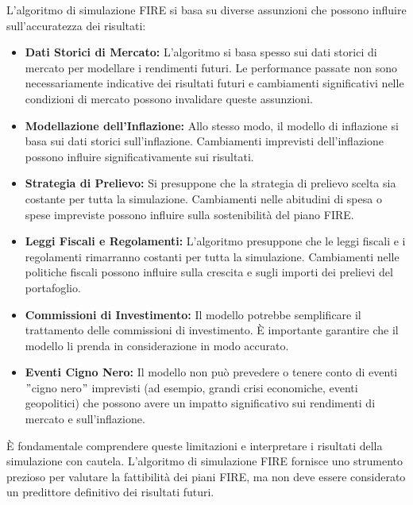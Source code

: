 \documentclass{article}
\begin{document}
L'algoritmo di simulazione FIRE si basa su diverse assunzioni che possono
influire sull'accuratezza dei risultati:
    \begin{itemize}
        \item \textbf{Dati Storici di Mercato:} L'algoritmo si basa spesso sui
        dati storici di mercato per modellare i rendimenti futuri.
        Le
        performance passate non sono necessariamente indicative dei risultati
        futuri e cambiamenti significativi nelle condizioni di mercato possono
        invalidare queste assunzioni.
        \item \textbf{Modellazione dell'Inflazione:} Allo stesso modo, il
        modello di inflazione si basa sui dati storici sull'inflazione.
        Cambiamenti imprevisti dell'inflazione possono influire
        significativamente sui risultati.
        \item \textbf{Strategia di Prelievo:} Si presuppone che la strategia di
        prelievo scelta sia costante per tutta la simulazione.
        Cambiamenti nelle
        abitudini di spesa o spese impreviste possono influire sulla
        sostenibilità del piano FIRE\@.
        \item \textbf{Leggi Fiscali e Regolamenti:} L'algoritmo presuppone che
        le leggi fiscali e i regolamenti rimarranno costanti per tutta la
        simulazione.
        Cambiamenti nelle politiche fiscali possono influire sulla
        crescita e sugli importi dei prelievi del portafoglio.
        \item \textbf{Commissioni di Investimento:} Il modello potrebbe
        semplificare il trattamento delle commissioni di investimento.
        È
        importante garantire che il modello li prenda in considerazione in modo
        accurato.
        \item \textbf{Eventi Cigno Nero:} Il modello non può prevedere o tenere
        conto di eventi \("\)cigno nero\("\) imprevisti (ad esempio, grandi
        crisi economiche, eventi geopolitici) che possono avere un impatto
        significativo sui rendimenti di mercato e sull'inflazione.
    \end{itemize}

    È fondamentale comprendere queste limitazioni e interpretare i risultati
    della simulazione con cautela.
    L'algoritmo di simulazione FIRE fornisce uno
    strumento prezioso per valutare la fattibilità dei piani FIRE, ma non deve
    essere considerato un predittore definitivo dei risultati futuri.
\end{document}
